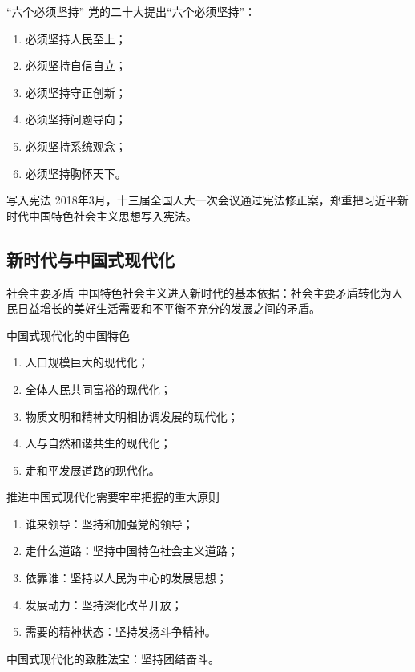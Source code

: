 \documentclass[12pt,a4paper]{ctexart}
\begin{document}
\begin{yellowbox}{“六个必须坚持”}
党的二十大提出“六个必须坚持”：
\begin{enumerate}
  \item 必须坚持人民至上；
  \item 必须坚持自信自立；
  \item 必须坚持守正创新；
  \item 必须坚持问题导向；
  \item 必须坚持系统观念；
  \item 必须坚持胸怀天下。
\end{enumerate}
\end{yellowbox}

\begin{yellowbox}{写入宪法}
2018年3月，十三届全国人大一次会议通过宪法修正案，郑重把习近平新时代中国特色社会主义思想写入宪法。
\end{yellowbox}

\subsection{新时代与中国式现代化}

\begin{yellowbox}{社会主要矛盾}
中国特色社会主义进入新时代的基本依据：社会主要矛盾转化为人民日益增长的美好生活需要和不平衡不充分的发展之间的矛盾。
\end{yellowbox}

\begin{yellowbox}{中国式现代化的中国特色}
\begin{enumerate}
  \item 人口规模巨大的现代化；
  \item 全体人民共同富裕的现代化；
  \item 物质文明和精神文明相协调发展的现代化；
  \item 人与自然和谐共生的现代化；
  \item 走和平发展道路的现代化。
\end{enumerate}
\end{yellowbox}

\begin{yellowbox}{推进中国式现代化需要牢牢把握的重大原则}
\begin{enumerate}
  \item 谁来领导：坚持和加强党的领导；
  \item 走什么道路：坚持中国特色社会主义道路；
  \item 依靠谁：坚持以人民为中心的发展思想；
  \item 发展动力：坚持深化改革开放；
  \item 需要的精神状态：坚持发扬斗争精神。
\end{enumerate}
中国式现代化的致胜法宝：坚持团结奋斗。
\end{yellowbox}
\end{document}
